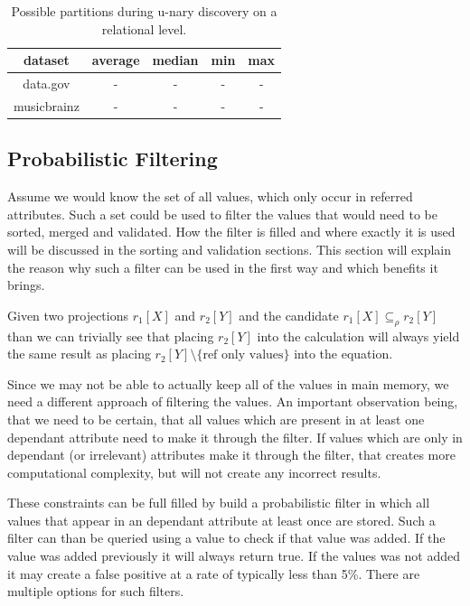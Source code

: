 \begin{table}
    \label{tab:partitioning}
    \begin{tabular}{c|c|c|c|c} 
     dataset & average & median & min & max\\ 
     \hline\hline
     data.gov & - & - & - & -\\ 
     \hline
     musicbrainz & - & - & - & -\\
    \end{tabular}
    \caption{Possible partitions during u-nary discovery on a relational level.}
\end{table}

\subsection{Probabilistic Filtering}
Assume we would know the set of all values, which only occur in referred attributes. Such a set could be used to filter the values that would need to be sorted, merged and validated. How the filter is filled and where exactly it is used will be discussed in the sorting and validation sections. This section will explain the reason why such a filter can be used in the first way and which benefits it brings.

Given two projections $r_1[X]$ and $r_2[Y]$ and the candidate $r_1[X] \subseteq_\rho r_2[Y]$ than we can trivially see that placing $r_2[Y]$ into the calculation will always yield the same result as placing $r_2[Y] \setminus \text{\{ref only values\}}$ into the equation.

Since we may not be able to actually keep all of the values in main memory, we need a different approach of filtering the values. An important observation being, that we need to be certain, that all values which are present in at least one dependant attribute need to make it through the filter. If values which are only in dependant (or irrelevant) attributes make it through the filter, that creates more computational complexity, but will not create any incorrect results.

These constraints can be full filled by build a probabilistic filter in which all values that appear in an dependant attribute at least once are stored. Such a filter can than be queried using a value to check if that value was added. If the value was added previously it will always return true. If the values was not added it may create a false positive at a rate of typically less than 5\%. There are multiple options for such filters.

